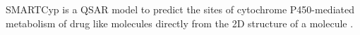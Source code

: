 SMARTCyp is a QSAR model to predict the sites of cytochrome P450-mediated metabolism of drug like molecules directly from the 2D structure of a molecule \cite{Rydberg_2010}.